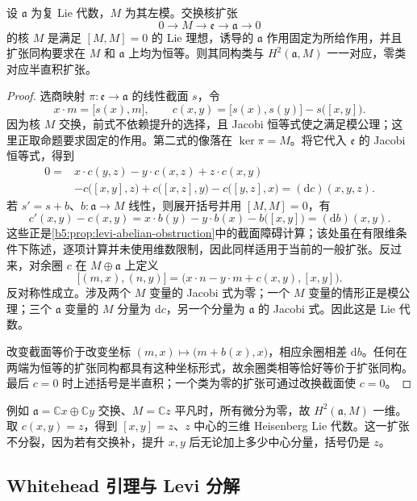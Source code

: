 \begin{proposition}\label{b5:prop:lie-h2-extensions}
	设 \(\mathfrak a\) 为复 Lie 代数，\(M\) 为其左模。交换核扩张
	\[
		0\longrightarrow M\longrightarrow\mathfrak e\longrightarrow\mathfrak a \longrightarrow0
	\]
	的核 \(M\) 是满足 \([M,M]=0\) 的 Lie 理想，诱导的 \(\mathfrak a\) 作用固定为所给作用，并且扩张同构要求在 \(M\) 和 \(\mathfrak a\) 上均为恒等。则其同构类与 \(H^2(\mathfrak a,M)\) 一一对应，零类对应半直积扩张。
\end{proposition}
\begin{proof}
	选商映射 \(\pi:\mathfrak e\to\mathfrak a\) 的线性截面 \(s\)，令
	\[
		x\cdot m=\bigl[s(x),m\bigr],\qquad c(x,y)=\bigl[s(x),s(y)\bigr]-s\bigl([x,y]\bigr).
	\]
	因为核 \(M\) 交换，前式不依赖提升的选择，且 Jacobi 恒等式使之满足模公理；这里正取命题要求固定的作用。第二式的像落在 \(\ker\pi=M\)。将它代入 \(\mathfrak e\) 的 Jacobi 恒等式，得到
	\[
		\begin{aligned}
			0={}&x\cdot c(y,z)-y\cdot c(x,z)+z\cdot c(x,y)\\
			&-c\bigl([x,y],z\bigr)+c\bigl([x,z],y\bigr) -c\bigl([y,z],x\bigr)=(\mathrm{d}c)(x,y,z).
		\end{aligned}
	\]
	若 \(s'=s+b\)、\(b:\mathfrak a\to M\) 线性，则展开括号并用 \([M,M]=0\)，有
	\[
		c'(x,y)-c(x,y) =x\cdot b(y)-y\cdot b(x)-b\bigl([x,y]\bigr) =(\mathrm{d}b)(x,y).
	\]
	这些正是\cref{b5:prop:levi-abelian-obstruction}中的截面障碍计算；该处虽在有限维条件下陈述，逐项计算并未使用维数限制，因此同样适用于当前的一般扩张。反过来，对余圈 \(c\) 在 \(M\oplus\mathfrak a\) 上定义
	\[
		\bigl[(m,x),(n,y)\bigr] =\bigl(x\cdot n-y\cdot m+c(x,y),[x,y]\bigr).
	\]
	反对称性成立。涉及两个 \(M\) 变量的 Jacobi 式为零；一个 \(M\) 变量的情形正是模公理；三个 \(\mathfrak a\) 变量的 \(M\) 分量为 \(\mathrm{d}c\)，另一个分量为 \(\mathfrak a\) 的 Jacobi 式。因此这是 Lie 代数。

	改变截面等价于改变坐标 \((m,x)\mapsto\bigl(m+b(x),x\bigr)\)，相应余圈相差 \(\mathrm{d}b\)。任何在两端为恒等的扩张同构都具有这种坐标形式，故余圈类相等恰好等价于扩张同构。最后 \(c=0\) 时上述括号是半直积；一个类为零的扩张可通过改换截面使 \(c=0\)。
\end{proof}

例如 \(\mathfrak a=\mathbb Cx\oplus\mathbb Cy\) 交换、\(M=\mathbb Cz\) 平凡时，所有微分为零，故 \(H^2(\mathfrak a,M)\) 一维。取 \(c(x,y)=z\)，得到 \([x,y]=z\)、\(z\) 中心的三维 Heisenberg Lie 代数。这一扩张不分裂，因为若有交换补，提升 \(x,y\) 后无论加上多少中心分量，括号仍是 \(z\)。

\subsection{Whitehead 引理与 Levi 分解}
\label{b5:subsec:2003:03}

